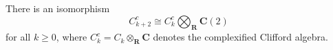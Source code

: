There is an isomorphism
$$
C_{k+2}^c \cong C_k^c \bigotimes_{\mathbf{R}} \mathbf{C}(2)
$$
for all $k \geq 0$, where $C_k^c = C_k \otimes_{\mathbf{R}} \mathbf{C}$ denotes the complexified Clifford algebra.
